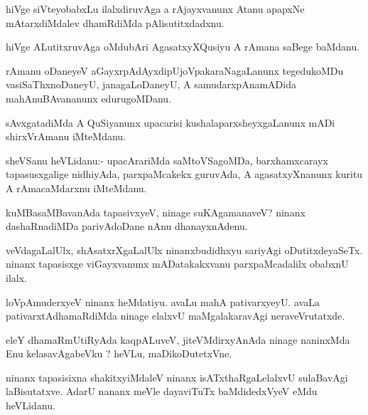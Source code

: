 \documentclass{article}
\begin{document}
\begin{mn}%
hiVge siVteyobabxLu ilalxdiruvAga a rAjayxvanunx Atanu apapxNe mAtarxdiMdalev  dhamRdiMda 
pAlisutitxdadxnu.
\end{mn}

\begin{mn}%
hiVge ALutitxruvAga oMdubAri AgasatxyXQusiyu A rAmana saBege baMdanu.
\end{mn}

\begin{mn}%
rAmanu oDaneyeV aGayxrpAdAyxdipUjoVpakaraNagaLanunx tegedukoMDu vasiSaThxnoDaneyU, 
janagaLoDaneyU, A samudarxpAnamADida mahAnuBAvananunx edurugoMDanu.
\end{mn}

\begin{mn}%
sAvxgatadiMda A QuSiyanunx upacarisi kushalaparxsheyxgaLanunx mADi shirxVrAmanu iMteMdanu.
\end{mn}




\begin{mn}%
sheVSanu heVLidanu:- upacArariMda saMtoVSagoMDa, barxhamxcarayx tapasusxgalige nidhiyAda, 
parxpaMcakekx guruvAda, A agasatxyXnanunx kuritu A rAmacaMdarxnu iMteMdanu.
\end{mn}

\begin{mn}%
kuMBasaMBavanAda tapasivxyeV, ninage suKAgamanaveV? ninanx dashaRnadiMDa parivAdoDane nAnu 
dhanayxnAdenu.
\end{mn}

\begin{mn}%
veVdagaLalUlx, shAsatxrXgaLalUlx ninanxbudidhxyu sariyAgi oDutitxdeyaSeTx.  ninanx 
tapasisxge viGayxvanunx mADatakakxvanu parxpaMcadalilx obabxnU ilalx.
\end{mn}

\begin{mn}%
loVpAmuderxyeV ninanx heMdatiyu. avaLu mahA pativarxyeyU. avaLa pativarxtAdhamaRdiMda 
ninage elalxvU maMgalakaravAgi neraveVrutatxde.
\end{mn}

\begin{mn}%
eleY dhamaRmUtiRyAda kaqpALuveV, jiteVMdirxyAnAda ninage naninxMda Enu kelasavAgabeVku ? 
heVLu, maDikoDutetxVne.
\end{mn}

\begin{mn}%
ninanx tapasisixna shakitxyiMdaleV ninanx isATxthaRgaLelalxvU sulaBavAgi laBisutatxve. 
AdarU nananx meVle dayaviTuTx baMdidedxVyeV eMdu heVLidanu.
\end{mn}
\end{document}
